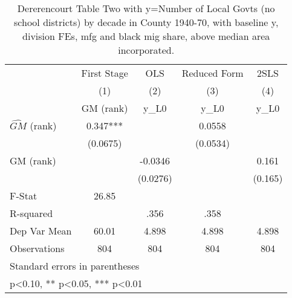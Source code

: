 \begin{table}[htbp]\centering
\def\sym#1{\ifmmode^{#1}\else\(^{#1}\)\fi}
\caption{Dererencourt Table Two with y=Number of Local Govts (no school districts) by decade in County 1940-70, with baseline y, division FEs, mfg and black mig share, above median area incorporated.}
\begin{tabular}{l*{4}{c}}
\toprule
                    & First Stage   &         OLS   &Reduced Form   &        2SLS   \\
                    &\multicolumn{1}{c}{(1)}&\multicolumn{1}{c}{(2)}&\multicolumn{1}{c}{(3)}&\multicolumn{1}{c}{(4)}\\
                    &\multicolumn{1}{c}{GM  (rank)}&\multicolumn{1}{c}{y\_L0}&\multicolumn{1}{c}{y\_L0}&\multicolumn{1}{c}{y\_L0}\\
\midrule
$\hat{GM}$ (rank)   &       0.347***&               &      0.0558   &               \\
                    &    (0.0675)   &               &    (0.0534)   &               \\
\addlinespace
GM  (rank)          &               &     -0.0346   &               &       0.161   \\
                    &               &    (0.0276)   &               &     (0.165)   \\
\midrule
F-Stat              &       26.85   &               &               &               \\
R-squared           &               &        .356   &        .358   &               \\
Dep Var Mean        &       60.01   &       4.898   &       4.898   &       4.898   \\
Observations        &         804   &         804   &         804   &         804   \\
\bottomrule
\multicolumn{5}{l}{\footnotesize Standard errors in parentheses}\\
\multicolumn{5}{l}{\footnotesize * p<0.10, ** p<0.05, *** p<0.01}\\
\end{tabular}
\end{table}
